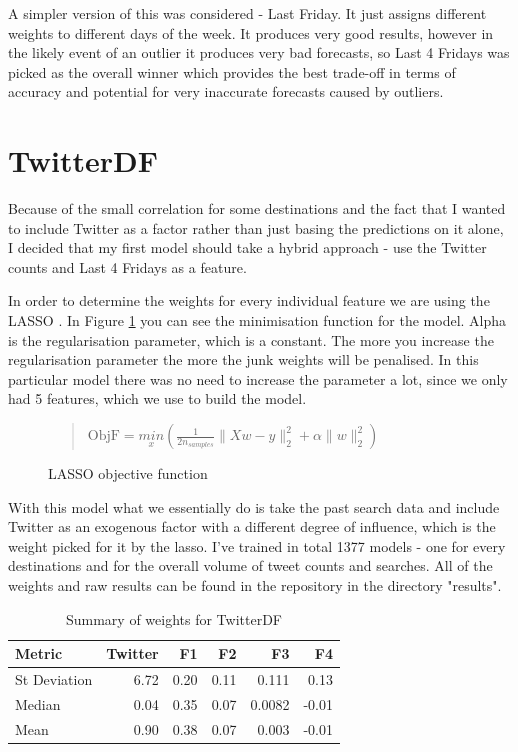 \documentclass[minf,frontabs,twoside,singlespacing,parskip]{infthesis}
\begin{document}
A simpler version of this was considered - Last Friday. It just assigns different weights to different days of the week. It produces very good results, however in the likely event of an outlier it produces very bad forecasts, so Last 4 Fridays was picked as the overall winner which provides the best trade-off in terms of accuracy and potential for very inaccurate forecasts caused by outliers.

\section{TwitterDF}

Because of the small correlation for some destinations and the fact that I wanted to include Twitter as a factor rather than just basing the predictions on it alone, I decided that my first model should take a hybrid approach - use the Twitter counts and Last 4 Fridays as a feature. 


In order to determine the weights for every individual feature we are using the LASSO \cite{lasso}. In Figure \ref{lass-obj} you can see the minimisation function for the model. Alpha is the regularisation parameter, which is a constant. The more you increase the regularisation parameter the more the junk weights will be penalised. In this particular model there was no need to increase the parameter a lot, since we only had 5 features, which we use to build the model. 

\begin{figure}[h]
\vspace*{\fill} 
\begin{quote} 
\centering 
$ \text{ObjF} = \underset{x}{min}({\frac{1}{2n_{samples}}} \|Xw - y \|_2^2 + \alpha\|w\|_2^2) $
\end{quote}
\vspace*{\fill}
\caption{LASSO objective function}
\label{lass-obj}
\end{figure}


With this model what we essentially do is take the past search data and include Twitter as an exogenous factor with a different degree of influence, which is the weight picked for it by the lasso. I've trained in total 1377 models - one for every destinations and for the overall volume of tweet counts and searches. All of the weights and raw results can be found in the repository in the directory "results". 


\begin{table}[h]
\begin{center}
\begin{tabular}{ l | r | r | r | r | r}
\textbf{Metric} & \textbf{Twitter} & \textbf{F1} & \textbf{F2} & \textbf{F3} & \textbf{F4}\\
\hline
St Deviation & 6.72 & 0.20 & 0.11 & 0.111 & 0.13\\
Median & 0.04 & 0.35 & 0.07 & 0.0082 & -0.01\\
Mean & 0.90 & 0.38 & 0.07 & 0.003 & -0.01\\
\end{tabular}
\end{center}
\caption{Summary of weights for TwitterDF}
\end{table}
\end{document}
